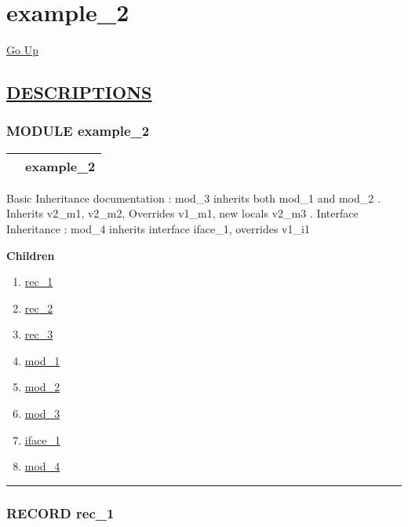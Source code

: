 \chapter*{\color{headfile}
example_2
}
\hypertarget{ecldoc:toc:example_2}{}
\hyperlink{ecldoc:toc:root}{Go Up}


\section*{\underline{\textsf{DESCRIPTIONS}}}
\subsection*{\textsf{\colorbox{headtoc}{\color{white} MODULE}
example\_2}}

\hypertarget{ecldoc:example_2}{}

{\renewcommand{\arraystretch}{1.5}
\begin{tabularx}{\textwidth}{|>{\raggedright\arraybackslash}l|X|}
\hline
\hspace{0pt}\mytexttt{\color{red} } & \textbf{example\_2} \\
\hline
\end{tabularx}
}

\par
Basic Inheritance documentation : mod\_3 inherits both mod\_1 and mod\_2 . Inherits v2\_m1, v2\_m2, Overrides v1\_m1, new locals v2\_m3 . Interface Inheritance : mod\_4 inherits interface iface\_1, overrides v1\_i1


\textbf{Children}
\begin{enumerate}
\item \hyperlink{ecldoc:example_2.rec_1}{rec\_1}
\item \hyperlink{ecldoc:example_2.rec_2}{rec\_2}
\item \hyperlink{ecldoc:example_2.rec_3}{rec\_3}
\item \hyperlink{ecldoc:example_2.mod_1}{mod\_1}
\item \hyperlink{ecldoc:example_2.mod_2}{mod\_2}
\item \hyperlink{ecldoc:example_2.mod_3}{mod\_3}
\item \hyperlink{ecldoc:example_2.iface_1}{iface\_1}
\item \hyperlink{ecldoc:example_2.mod_4}{mod\_4}
\end{enumerate}

\rule{\linewidth}{0.5pt}

\subsection*{\textsf{\colorbox{headtoc}{\color{white} RECORD}
rec\_1}}

